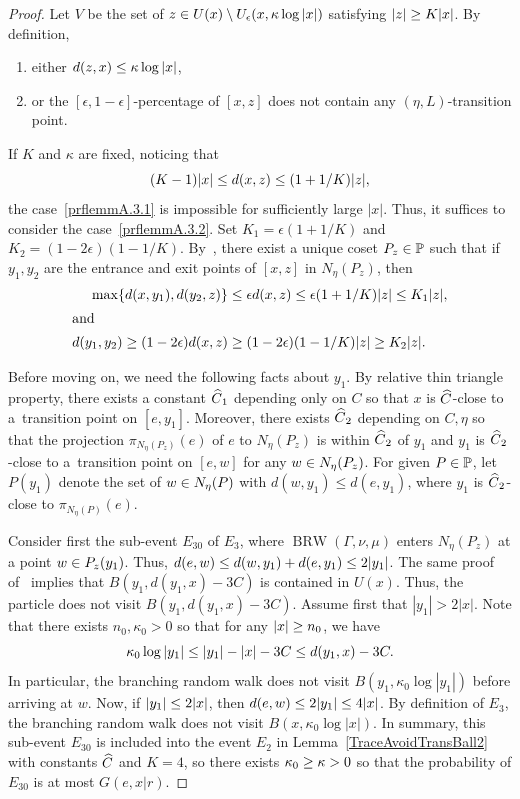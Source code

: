 \documentclass[AHL,Unicode,longabstracts]{cedram}
\newcommand{\bbP}{\mathbb{P}}
\DeclareMathOperator{\BRW}{BRW}
\let\oldin\in
\renewcommand{\in}{\mathchoice{\oldin}{\oldin}{\,\oldin\,}{\,\oldin\,}}
\let\oldge\ge
\renewcommand{\ge}{\mathchoice{\oldge}{\oldge}{\,\oldge\,}{\,\oldge\,}}
\let\oldle\le
\renewcommand{\le}{\mathchoice{\oldle}{\oldle}{\,\oldle\,}{\,\oldle\,}}
\let\oldhat\hat
\renewcommand*{\hat}[1]{\mathchoice{\widehat{#1}}{\widehat{#1}}{\oldhat{#1}}{\oldhat{#1}}}
\begin{document}
\begin{proof}
Let $V$ be the set of $z\in U(x)\setminus U_{\epsilon}(x,\kappa \log |x|)$ satisfying $|z|\ge K|x|$. By definition,
\begin{enumerate}
\item\label{prflemmA.3.1} either $d(z, x)\le \kappa \log |x|$,
\item\label{prflemmA.3.2} or the $[\epsilon, 1-\epsilon]$-percentage of $[x,z]$ does not contain any $(\eta,L)$-transition point.
\end{enumerate}
If $K $ and $ \kappa$ are fixed, noticing that
\[
(K-1)|x|\le d(x,z)\le (1+1/K)|z|,
\]
the case~\eqref{prflemmA.3.1} is impossible for sufficiently large $|x|$. Thus, it suffices to consider the case~\eqref{prflemmA.3.2}. Set $K_1=\epsilon(1+1/K)$ and $K_2=(1-2\epsilon)(1-1/K)$. By~\cite[Lemma~6.1]{DWY}, there exist a unique coset $P_z\in \bbP$ such that if $y_1,y_2$ are the entrance and exit points of $[x,z]$ in $N_\eta(P_z)$, then
\begin{align}
\max\{d(x,y_1), d(y_2,z)\} &\le \epsilon d(x,z)\le \epsilon(1+1/K)|z|\le K_1|z|,\label{y1y2Def}
\\
\intertext{and}
d(y_1,y_2)\geq (1-2\epsilon)d(x,z) &\ge (1-2\epsilon)(1-1/K)|z|\ge K_2|z|.\label{y1y2EQ}
\end{align}


Before moving on, we need the following facts about $y_1$. By relative thin triangle property, there exists a constant $\hat C_1$ depending only on $C$ so that $x$ is $\hat C$-close to a~transition point on $[e,y_1]$. Moreover, there exists $\hat C_2$ depending on $C, \eta$ so that the projection $\pi_{N_{\eta}(P_z)}(e)$ of $e$ to $N_{\eta}(P_z)$ is within $\hat C_2$ of $y_1$ and $y_1$ is $\hat C_2$-close to a~transition point on $[e,w]$ for any $w\in N_\eta(P_z)$. For given $P\in \bbP$, let $P(y_1)$ denote the set of $w\in N_\eta(P)$ with $d(w,y_1)\leq d(e,y_1)$, where $y_1$ is $\hat C_2$-close to $\pi_{N_\eta(P)}(e)$.

Consider first the sub-event $E_{30}$ of $E_3$, where $\BRW(\Gamma,\nu,\mu)$ enters $N_\eta(P_z)$ at a point $w\in P_z(y_1)$. Thus, $d(e,w)\le d(w,y_1)+ d(e,y_1)\le 2|y_1|$.
The same proof of~\cite[Lemma~6.6]{DWY} implies that $B(y_1, d(y_1,x)-3C)$ is contained in $U(x)$. Thus, the particle does not visit $B(y_1, d(y_1,x)-3C)$. Assume first that $|y_1|>2|x|$. Note that there exists $n_0, \kappa_0>0$ so that for any $|x|\ge n_0$, we have
\[
\kappa_0 \log |y_1| \le |y_1|-|x|-3C\le d(y_1,x)-3C.
\]
In particular, the branching random walk does not visit $B(y_1,\kappa_0 \log |y_1|)$ before arriving at $w$. Now, if $|y_1|\le 2|x|$, then $d(e,w)\le 2|y_1|\le 4|x|$. By definition of $E_3$, the branching random walk does not visit $B(x,\kappa_0 \log |x|)$. In summary, this sub-event $E_{30}$ is included into the event $E_2$ in Lemma~\ref{TraceAvoidTransBall2} with constants $\hat C$ and $K=4$, so there exists $\kappa_0\ge \kappa>0$ so that the probability of $E_{30}$ is at most $G(e,x|r)$.


\end{proof}
\end{document}
